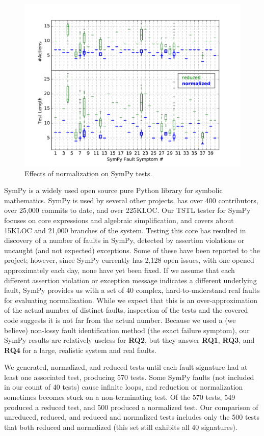 \begin{figure}
\includegraphics[width=\columnwidth]{sympyd}
\caption{Effects of normalization on SymPy tests.}
\label{lengthandactions}
\end{figure}

SymPy \cite{SymPy} is a widely used open source pure Python library
for symbolic mathematics.  SymPy is used by several other projects,
has over 400 contributors, over 25,000 commits to date, and over
225KLOC.  Our TSTL tester for SymPy focuses on core expressions and
algebraic simplification, and covers about 15KLOC and 21,000 branches of
the system.  Testing this core has resulted in discovery of a number
of faults in SymPy, detected by assertion violations or uncaught (and
not expected) exceptions.  Some of these have been reported to the project;
however, since SymPy currently has 2,128 open issues, with one opened
approximately each day, none have yet been fixed.  If we assume that
each different assertion violation or exception message indicates a
different underlying fault, SymPy provides us with a set of 40
complex, hard-to-understand real faults for evaluating normalization.
While we expect that this is an over-approximation of the actual
number of distinct faults, inspection of the tests and the covered
code suggests it is not far from the actual number.  Because we used a
(we believe)
non-lossy fault identification method (the exact failure symptom), our
SymPy results are relatively useless for {\bf RQ2}, but they answer {\bf RQ1}, {\bf RQ3}, and {\bf RQ4} for a large, realistic
system and real faults.

We generated, normalized, and reduced tests until each fault
signature had at least one associated test, producing 570 tests.  Some SymPy faults (not
included in our count of 40 tests) cause infinite loops, and
reduction or normalization sometimes becomes stuck on a
non-terminating test.  Of the 570 tests, 549 produced a reduced test,
and 500 produced a normalized test.  Our comparison of unreduced,
reduced, and reduced and normalized tests includes only the 500 tests
that both reduced and normalized (this
set still exhibits all 40 signatures).

